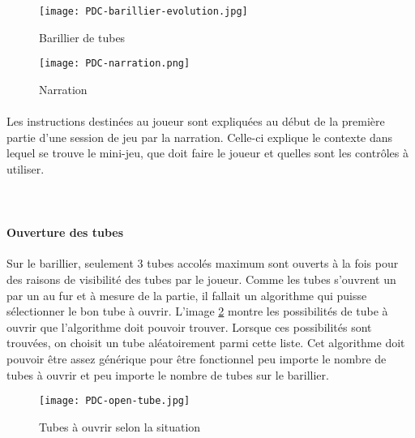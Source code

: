 \begin{figure}[H]
    \begin{center}
    \texttt{[image: PDC-barillier-evolution.jpg]}
    \end{center}
    \caption{Barillier de tubes}
\label{BarillierTube}
\end{figure}

\begin{wrapfigure}[5]{l}{4cm}
    \vspace{-25pt}
    \texttt{[image: PDC-narration.png]}
    \captionsetup{labelformat=simpleNumber}
    \caption{Narration}
\end{wrapfigure}

\paragraph{}Les instructions destinées au joueur sont expliquées au début de la première partie d'une session de jeu par la narration. Celle-ci explique le contexte dans lequel se
trouve le mini-jeu, que doit faire le joueur et quelles sont les contrôles à utiliser. \\ \\ \\

\paragraph{Ouverture des tubes}Sur le barillier, seulement 3 tubes accolés maximum sont ouverts à la fois pour des raisons de visibilité des tubes par le joueur. Comme les tubes
s'ouvrent un par un au fur et à mesure de la partie, il fallait un algorithme qui puisse sélectionner le bon tube à ouvrir. L'image \ref{OpenTube} montre les possibilités de tube à
ouvrir que l'algorithme doit pouvoir trouver. Lorsque ces possibilités sont trouvées, on choisit un tube aléatoirement parmi cette liste. Cet algorithme doit pouvoir être assez
générique pour être fonctionnel peu importe le nombre de tubes à ouvrir et peu importe le nombre de tubes sur le barillier.

\begin{figure}[H]
    \begin{center}
    \texttt{[image: PDC-open-tube.jpg]}
    \end{center}
    \caption{Tubes à ouvrir selon la situation}
\label{OpenTube}
\end{figure}

